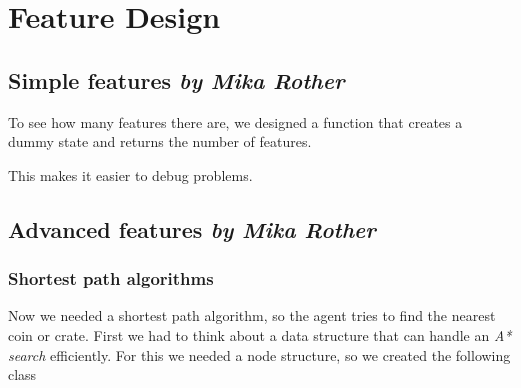 \chapter{Feature Design}
\section[Simple features]{Simple features \hfill \small \normalfont\textit{by Mika Rother}}
To see how many features there are, we designed a function that creates a dummy state and returns the number of features.

This makes it easier to debug problems.

\section[Advanced features]{Advanced features \hfill \small \normalfont\textit{by Mika Rother}}
\subsection{Shortest path algorithms}
Now we needed a shortest path algorithm, so the agent tries to find the nearest coin or crate. First we had to think about a data structure that can handle an \textit{A* search} efficiently. For this we needed a node structure, so we created the following class
